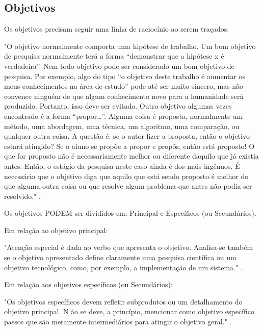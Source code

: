 \documentclass[
	article,			%
	12pt,				%
	oneside,			%
	a4paper,			%
	english,			%
	brazil,				%
	sumario=tradicional
	]{abntex2}
\begin{document}
\subsection{Objetivos}

Os objetivos precisam seguir uma linha de raciocínio ao serem traçados.
    \begin{citacao}
    "O objetivo normalmente comporta uma hipótese de trabalho. Um bom objetivo de pesquisa normalmente terá
    a forma “demonstrar que a hipótese x é verdadeira”.
    Nem todo objetivo pode ser considerado um bom objetivo de pesquisa. Por exemplo, algo do tipo “o objetivo
    deste trabalho é aumentar os meus conhecimentos na área de estudo” pode até ser muito sincero, mas não
    convence ninguém de que algum conhecimento novo para a humanidade será produzido. Portanto, isso deve ser evitado.
    Outro objetivo algumas vezes encontrado é a forma “propor…”. Alguma coisa é proposta, normalmente um
    método, uma abordagem, uma técnica, um algoritmo, uma comparação, ou qualquer outra coisa. A questão é:
    se o autor fizer a proposta, então o objetivo estará atingido? Se o aluno se propõe a propor e propôs, então está
    proposto! O que for proposto não é necessariamente melhor ou diferente daquilo que já existia antes. Então, o
    estágio da pesquisa neste caso ainda é dos mais ingênuos.
    É necessário que o objetivo diga que aquilo que está sendo proposto é melhor do que alguma outra coisa ou
    que resolve algum problema que antes não podia ser resolvido."  \cite{PESQUISA:RAUL}.
    \end{citacao}

Os objetivos PODEM ser divididos em: Principal e Específicos (ou Secundários).

Em relação ao objetivo principal:

    \begin{citacao}
    "Atenção especial é dada ao verbo que apresenta o objetivo.
    Analisa-se também se o objetivo apresentado define claramente uma pesquisa científica ou um objetivo
    tecnológico, como, por exemplo, a implementação de um sistema."
    \lipsum[5] \cite{PESQUISA:RAUL}.
    \end{citacao}

Em relação aos objetivos específicos (ou Secundários):

    \begin{citacao}
    "Os objetivos específicos devem refletir subprodutos ou um detalhamento do objetivo principal. N ão se deve, a
    princípio, mencionar como objetivo específico passos que são meramente intermediários para atingir o objetivo
    geral."
    \lipsum[5] \cite{PESQUISA:RAUL}.
    \end{citacao}
\end{document}
